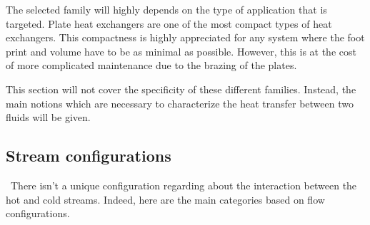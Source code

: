 The selected family will highly depends on the type of application that is targeted. Plate heat exchangers are one of the most compact types of heat exchangers. This compactness is highly appreciated for any system where the foot print and volume have to be as minimal as possible. However, this is at the cost of more complicated maintenance due to the brazing of the plates.

This section will not cover the specificity of these different families. Instead, the main notions which are necessary to characterize the heat transfer between two fluids will be given.

\subsection{Stream configurations}
\quad\ There isn't a unique configuration regarding about the interaction between the hot and cold streams. Indeed, here are the main categories based on flow configurations.

